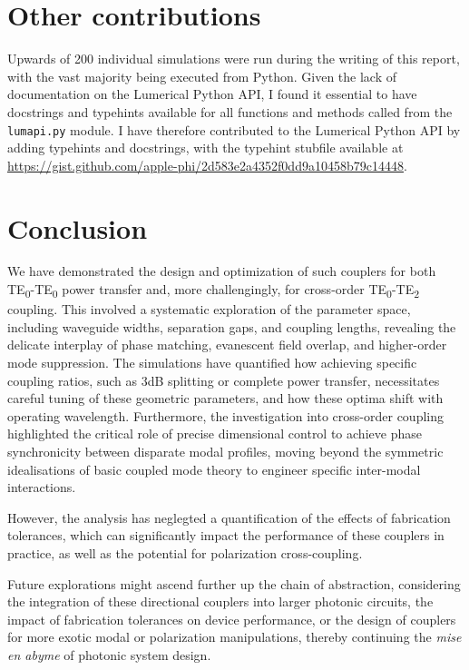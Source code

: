 \documentclass[10pt, a4paper]{article}
\begin{document}
\section{Other contributions}
Upwards of 200 individual simulations were run during the writing of this report,
with the vast majority being executed from Python.
Given the lack of documentation on the Lumerical Python API,
I found it essential to have docstrings and typehints available for all functions and methods called from the \texttt{lumapi.py} module.
I have therefore contributed to the Lumerical Python API by adding typehints and docstrings,
with the typehint stubfile available at \url{https://gist.github.com/apple-phi/2d583e2a4352f0dd9a10458b79c14448}.

\section{Conclusion}

We have demonstrated the design and optimization of such couplers for both TE\textsubscript{0}-TE\textsubscript{0} power transfer and, more challengingly, for cross-order TE\textsubscript{0}-TE\textsubscript{2} coupling.
This involved a systematic exploration of the parameter space, including waveguide widths, separation gaps, and coupling lengths, revealing the delicate interplay of phase matching, evanescent field overlap, and higher-order mode suppression.
The simulations have quantified how achieving specific coupling ratios, such as 3dB splitting or complete power transfer, necessitates careful tuning of these geometric parameters, and how these optima shift with operating wavelength.
Furthermore, the investigation into cross-order coupling highlighted the critical role of precise dimensional control to achieve phase synchronicity between disparate modal profiles, moving beyond the symmetric idealisations of basic coupled mode theory to engineer specific inter-modal interactions.

However, the analysis has neglegted a quantification of the effects of fabrication tolerances, which can significantly impact the performance of these couplers in practice,
as well as the potential for polarization cross-coupling.

Future explorations might ascend further up the chain of abstraction, considering the integration of these directional couplers into larger photonic circuits, the impact of fabrication tolerances on device performance, or the design of couplers for more exotic modal or polarization manipulations, thereby continuing the \textit{mise en abyme} of photonic system design.

\printbibliography
\end{document}

